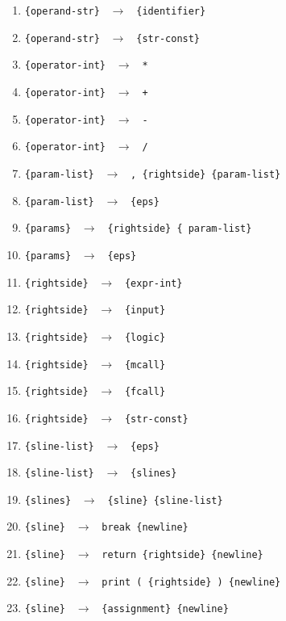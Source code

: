 \documentclass[a4paper,10pt,notitlepage,pdftex]{scrreprt}
\begin{document}
\begin{enumerate}
                \item \verb'{operand-str} ' $\rightarrow$ \verb' {identifier}'
                \item \verb'{operand-str} ' $\rightarrow$ \verb' {str-const}'
                \item \verb'{operator-int} ' $\rightarrow$ \verb' *'
                \item \verb'{operator-int} ' $\rightarrow$ \verb' +'
                \item \verb'{operator-int} ' $\rightarrow$ \verb' -'
                \item \verb'{operator-int} ' $\rightarrow$ \verb' /'
                \item \verb'{param-list} ' $\rightarrow$ \verb' , {rightside} {param-list}'
                \item \verb'{param-list} ' $\rightarrow$ \verb' {eps}'
                \item \verb'{params} ' $\rightarrow$ \verb' {rightside} { param-list}'
                \item \verb'{params} ' $\rightarrow$ \verb' {eps}'
                \item \verb'{rightside} ' $\rightarrow$ \verb' {expr-int}'
                \item \verb'{rightside} ' $\rightarrow$ \verb' {input}'
                \item \verb'{rightside} ' $\rightarrow$ \verb' {logic}'
                \item \verb'{rightside} ' $\rightarrow$ \verb' {mcall}'
                \item \verb'{rightside} ' $\rightarrow$ \verb' {fcall}'
                \item \verb'{rightside} ' $\rightarrow$ \verb' {str-const}'
                \item \verb'{sline-list} ' $\rightarrow$ \verb' {eps}'
                \item \verb'{sline-list} ' $\rightarrow$ \verb' {slines}'
                \item \verb'{slines} ' $\rightarrow$ \verb' {sline} {sline-list}'
                \item \verb'{sline} ' $\rightarrow$ \verb' break {newline}'
                \item \verb'{sline} ' $\rightarrow$ \verb' return {rightside} {newline}'
                \item \verb'{sline} ' $\rightarrow$ \verb' print ( {rightside} ) {newline}'
                \item \verb'{sline} ' $\rightarrow$ \verb' {assignment} {newline}'

\end{enumerate}
\end{document}
